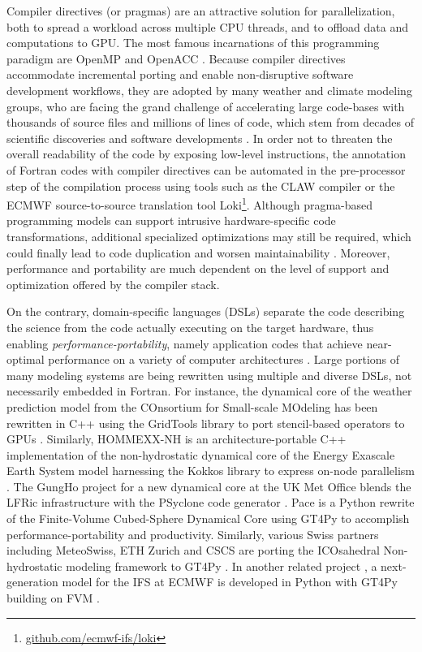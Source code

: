 \documentclass[main.tex]{subfiles}
\begin{document}
        Compiler directives (or pragmas) are an attractive solution for parallelization, both to spread a workload across multiple CPU threads, and to offload data and computations to GPU. The most famous incarnations of this programming paradigm are OpenMP \citep{dagum98} and OpenACC \citep{chandrasekaran17}. Because compiler directives accommodate incremental porting and enable non-disruptive software development workflows, they are adopted by many weather and climate modeling groups, who are facing the grand challenge of accelerating large code-bases with thousands of source files and millions of lines of code, which stem from decades of scientific discoveries and software developments \citep{lapillonne17, lapillonne20, randall22}. In order not to threaten the overall readability of the code by exposing low-level instructions, the annotation of Fortran codes with compiler directives can be automated in the pre-processor step of the compilation process using tools such as the CLAW compiler \citep{clement19} or the ECMWF source-to-source translation tool Loki\footnote{\url{github.com/ecmwf-ifs/loki}}. Although pragma-based programming models can support intrusive hardware-specific code transformations, additional specialized optimizations may still be required, which could finally lead to code duplication and worsen maintainability \citep{dahm23}. Moreover, performance and portability are much dependent on the level of support and optimization offered by the compiler stack.
        
        On the contrary, domain-specific languages (DSLs) separate the code describing the science from the code actually executing on the target hardware, thus enabling \emph{performance-portability}, namely application codes that achieve near-optimal performance on a variety of computer architectures \citep{deakin19}. Large portions of many modeling systems are being rewritten using multiple and diverse DSLs, not necessarily embedded in Fortran. For instance, the dynamical core of the weather prediction model from the COnsortium for Small-scale MOdeling \citep[COSMO;][]{baldauf11} has been rewritten in C++ using the GridTools library \citep{afanasyev21} to port stencil-based operators to GPUs \citep{fuhrer14, fuhrer18}. Similarly, HOMMEXX-NH \citep{bertagna20} is an architecture-portable C++ implementation of the non-hydrostatic dynamical core of the Energy Exascale Earth System model \citep[E3SM;][]{taylor20} harnessing the Kokkos library to express on-node parallelism \citep{edwards14}. The GungHo project for a new dynamical core at the UK Met Office  blends the LFRic infrastructure with the PSyclone code generator \citep{adams19}. Pace \citep{ben-nun22, dahm23} is a Python rewrite of the Finite-Volume Cubed-Sphere Dynamical Core \citep[FV3;][]{harris13} using GT4Py to accomplish performance-portability and productivity. Similarly, various Swiss partners including MeteoSwiss, ETH Zurich and CSCS are porting the ICOsahedral Non-hydrostatic modeling framework \citep[ICON;][]{zangl15} to GT4Py \citep{luz24}. In another related project \citep{kuhnlein23}, a next-generation model for the IFS at ECMWF is developed in Python with GT4Py building on FVM \citep{smolarkiewicz16, kuehnlein19}.
        
\end{document}
